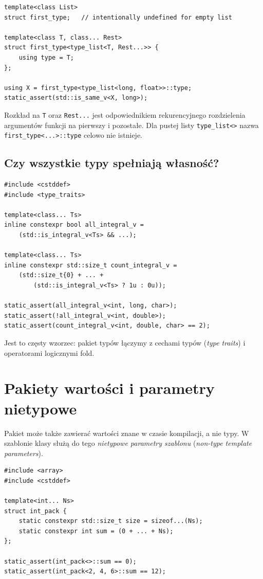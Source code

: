 \begin{lstlisting}
template<class List>
struct first_type;   // intentionally undefined for empty list

template<class T, class... Rest>
struct first_type<type_list<T, Rest...>> {
    using type = T;
};

using X = first_type<type_list<long, float>>::type;
static_assert(std::is_same_v<X, long>);
\end{lstlisting}

Rozkład na \texttt{T} oraz \texttt{Rest...} jest odpowiednikiem
rekurencyjnego rozdzielenia argumentów funkcji na pierwszy
i pozostałe. Dla pustej listy \texttt{type\_list<>} nazwa
\texttt{first\_type<...>::type} celowo nie istnieje.

\subsection{Czy wszystkie typy spełniają własność?}

\begin{lstlisting}
#include <cstddef>
#include <type_traits>

template<class... Ts>
inline constexpr bool all_integral_v =
    (std::is_integral_v<Ts> && ...);

template<class... Ts>
inline constexpr std::size_t count_integral_v =
    (std::size_t{0} + ... +
        (std::is_integral_v<Ts> ? 1u : 0u));

static_assert(all_integral_v<int, long, char>);
static_assert(!all_integral_v<int, double>);
static_assert(count_integral_v<int, double, char> == 2);
\end{lstlisting}

Jest to częsty wzorzec: pakiet typów łączymy z cechami
typów (\emph{type traits}) i operatorami logicznymi fold.

\section{Pakiety wartości i parametry nietypowe}

Pakiet może także zawierać wartości znane w czasie kompilacji,
a nie typy. W szablonie klasy służą do tego
\emph{nietypowe parametry szablonu} (\emph{non-type template parameters}).

\begin{lstlisting}
#include <array>
#include <cstddef>

template<int... Ns>
struct int_pack {
    static constexpr std::size_t size = sizeof...(Ns);
    static constexpr int sum = (0 + ... + Ns);
};

static_assert(int_pack<>::sum == 0);
static_assert(int_pack<2, 4, 6>::sum == 12);
\end{lstlisting}

